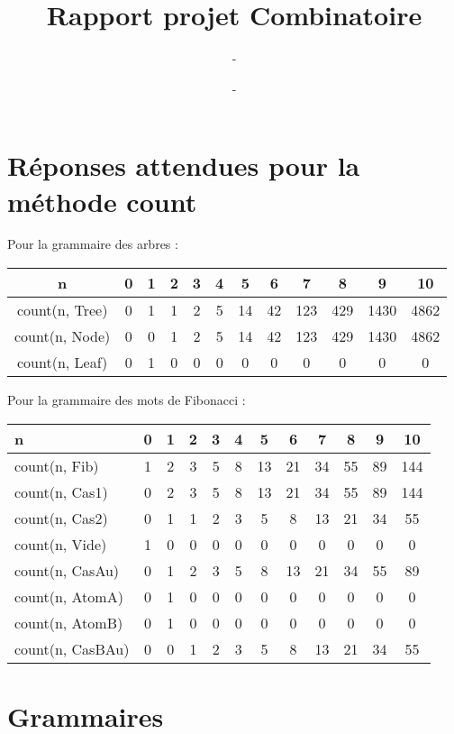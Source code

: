 \documentclass[a4paper, titlepage]{article}
\title{Rapport projet Combinatoire}
\author{-}
\date{-}
\begin{document}

\section{Réponses attendues pour la méthode count}
Pour la grammaire des arbres :
\begin{center}
\begin{tabular}{|c||c|c|c|c|c|c|c|c|c|c|c|}
\hline n & 0 & 1 & 2 & 3 & 4 & 5 & 6 & 7 & 8 & 9 & 10 \\
\hline
\hline count(n, Tree) & 0 & 1 & 1 & 2 & 5 & 14 & 42 & 123 & 429 & 1430
& 4862 \\
\hline count(n, Node) & 0 & 0 & 1 & 2 & 5 & 14 & 42 & 123 & 429 & 1430 & 4862 \\
\hline count(n, Leaf) & 0 & 1 & 0 & 0 & 0 & 0 & 0 & 0 & 0 & 0 & 0\\
\hline
\end{tabular}
\end{center}

Pour la grammaire des mots de Fibonacci :
\begin{center}
\begin{tabular}{|l||c|c|c|c|c|c|c|c|c|c|c|}
\hline n & 0 & 1 & 2 & 3 & 4 & 5 & 6 & 7 & 8 & 9 & 10 \\
\hline
\hline count(n, Fib) & 1 & 2 & 3 & 5 & 8 & 13 & 21 & 34 & 55 & 89 & 144 \\
\hline count(n, Cas1) & 0 & 2 & 3 & 5 & 8 & 13 & 21 & 34 & 55 & 89 & 144 \\
\hline count(n, Cas2) & 0 & 1 & 1 & 2 & 3 & 5 & 8 & 13 & 21 & 34 & 55\\
\hline count(n, Vide) & 1 & 0 & 0 & 0 & 0 & 0 & 0 & 0 & 0 & 0 & 0\\
\hline count(n, CasAu) & 0 & 1 & 2 & 3 & 5 & 8 & 13 & 21 & 34 & 55 & 89\\
\hline count(n, AtomA) & 0 & 1 & 0 & 0 & 0 & 0 & 0 & 0 & 0 & 0 & 0\\
\hline count(n, AtomB) & 0 & 1 & 0 & 0 & 0 & 0 & 0 & 0 & 0 & 0 & 0\\
\hline count(n, CasBAu) & 0 & 0 & 1 & 2 & 3 & 5 & 8 & 13 & 21 & 34 & 55\\
\hline
\end{tabular}
\end{center}

\section{Grammaires}
\end{document}

